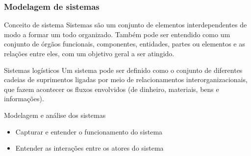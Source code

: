 \documentclass[10pt]{beamer}
\begin{document}
\begin{frame}
	\frametitle{Modelagem de sistemas} 
	
	\begin{block}{Conceito de sistema}
		Sistemas são um conjunto de elementos interdependentes de modo a formar um todo organizado. Também pode ser entendido como um conjunto de órgãos funcionais, componentes, entidades, partes ou elementos e as relações entre eles, com um objetivo geral a ser atingido.
	\end{block}

	\begin{block}{Sistemas logísticos}
		Um sistema pode ser definido como o conjunto de diferentes cadeias de suprimentos ligadas por meio de relacionamentos interorganizacionais, que fazem acontecer os fluxos envolvidos (de dinheiro, materiais, bens e informações).
		
	\end{block}
	
	Modelagem e análise dos sistemas
	
	\begin{itemize}
		\item Capturar e entender o funcionamento do sistema
		\item Entender as interações entre os atores do sistema
	\end{itemize}
	
\end{frame}
\end{document}
